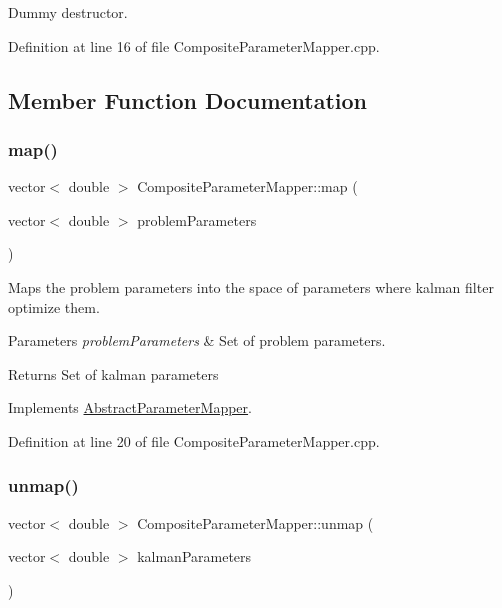 Dummy destructor. 

Definition at line 16 of file Composite\+Parameter\+Mapper.\+cpp.



\subsection{Member Function Documentation}
\mbox{\label{classCompositeParameterMapper_abac90f20835ad311cfdfc952956b9624}} 
\subsubsection{\texorpdfstring{map()}{map()}}
{\footnotesize\ttfamily vector$<$ double $>$ Composite\+Parameter\+Mapper\+::map (\begin{DoxyParamCaption}\item[{vector$<$ double $>$}]{problem\+Parameters }\end{DoxyParamCaption})\hspace{0.3cm}{\ttfamily [virtual]}}

Maps the problem parameters into the space of parameters where kalman filter optimize them. 
\begin{DoxyParams}{Parameters}
{\em problem\+Parameters} & Set of problem parameters. \\
\hline
\end{DoxyParams}
\begin{DoxyReturn}{Returns}
Set of kalman parameters 
\end{DoxyReturn}


Implements \mbox{\hyperlink{classAbstractParameterMapper_abb9e78545ff023f2b786b759ec2d23e4}{Abstract\+Parameter\+Mapper}}.



Definition at line 20 of file Composite\+Parameter\+Mapper.\+cpp.

\mbox{\label{classCompositeParameterMapper_a15d15009cf9026b22f27f5d8a5880a4e}} 
\subsubsection{\texorpdfstring{unmap()}{unmap()}}
{\footnotesize\ttfamily vector$<$ double $>$ Composite\+Parameter\+Mapper\+::unmap (\begin{DoxyParamCaption}\item[{vector$<$ double $>$}]{kalman\+Parameters }\end{DoxyParamCaption})\hspace{0.3cm}{\ttfamily [virtual]}}

